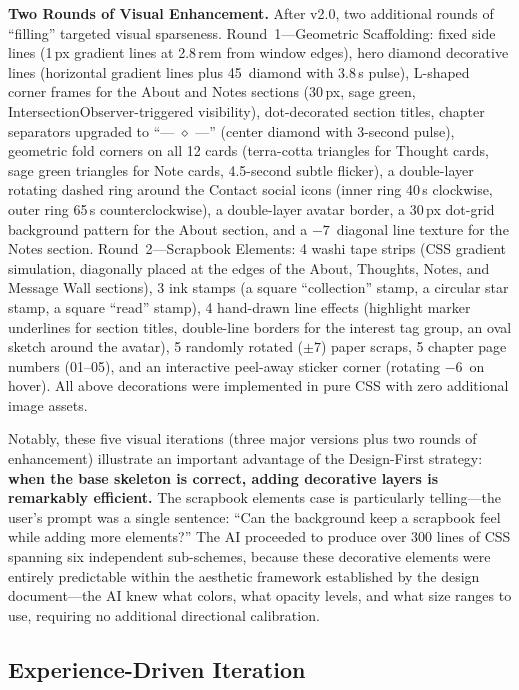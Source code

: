 \textbf{Two Rounds of Visual Enhancement.} After v2.0, two additional rounds of ``filling'' targeted visual sparseness. Round~1---Geometric Scaffolding: fixed side lines (1\,px gradient lines at 2.8\,rem from window edges), hero diamond decorative lines (horizontal gradient lines plus 45\textdegree\ diamond with 3.8\,s pulse), L-shaped corner frames for the About and Notes sections (30\,px, sage green, IntersectionObserver-triggered visibility), dot-decorated section titles, chapter separators upgraded to ``--- $\diamond$ ---'' (center diamond with 3-second pulse), geometric fold corners on all 12 cards (terra-cotta triangles for Thought cards, sage green triangles for Note cards, 4.5-second subtle flicker), a double-layer rotating dashed ring around the Contact social icons (inner ring 40\,s clockwise, outer ring 65\,s counterclockwise), a double-layer avatar border, a 30\,px dot-grid background pattern for the About section, and a $-7$\textdegree\ diagonal line texture for the Notes section. Round~2---Scrapbook Elements: 4 washi tape strips (CSS gradient simulation, diagonally placed at the edges of the About, Thoughts, Notes, and Message Wall sections), 3 ink stamps (a square ``collection'' stamp, a circular star stamp, a square ``read'' stamp), 4 hand-drawn line effects (highlight marker underlines for section titles, double-line borders for the interest tag group, an oval sketch around the avatar), 5 randomly rotated ($\pm7$\textdegree) paper scraps, 5 chapter page numbers (01--05), and an interactive peel-away sticker corner (rotating $-6$\textdegree\ on hover). All above decorations were implemented in pure CSS with zero additional image assets.

Notably, these five visual iterations (three major versions plus two rounds of enhancement) illustrate an important advantage of the Design-First strategy: \textbf{when the base skeleton is correct, adding decorative layers is remarkably efficient.} The scrapbook elements case is particularly telling---the user's prompt was a single sentence: ``Can the background keep a scrapbook feel while adding more elements?'' The AI proceeded to produce over 300 lines of CSS spanning six independent sub-schemes, because these decorative elements were entirely predictable within the aesthetic framework established by the design document---the AI knew what colors, what opacity levels, and what size ranges to use, requiring no additional directional calibration.

\subsection{Experience-Driven Iteration}


